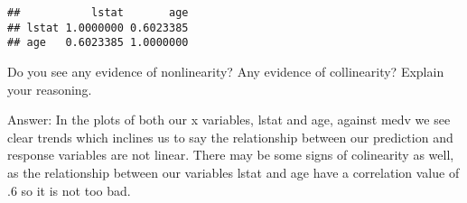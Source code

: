 \documentclass[
]{article}
\begin{document}
\begin{verbatim}
##           lstat       age
## lstat 1.0000000 0.6023385
## age   0.6023385 1.0000000
\end{verbatim}

Do you see any evidence of nonlinearity? Any evidence of collinearity?
Explain your reasoning.

Answer: In the plots of both our x variables, lstat and age, against
medv we see clear trends which inclines us to say the relationship
between our prediction and response variables are not linear. There may
be some signs of colinearity as well, as the relationship between our
variables lstat and age have a correlation value of .6 so it is not too
bad.
\end{document}
